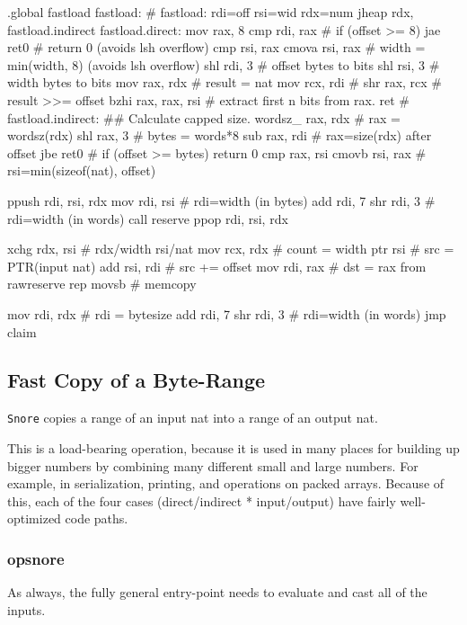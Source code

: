 \begin{asm}
.global fastload
fastload:                       # fastload: rdi=off rsi=wid rdx=num
	jheap	rdx, fastload.indirect
fastload.direct:
	mov	rax, 8
	cmp	rdi, rax        # if (offset >= 8)
	jae	ret0            #   return 0 (avoids lsh overflow)
	cmp	rsi, rax
	cmova	rsi, rax        # width = min(width, 8)  (avoids lsh overflow)
	shl	rdi, 3		# offset bytes to bits
	shl	rsi, 3		# width bytes to bits
	mov	rax, rdx        # result = nat
	mov	rcx, rdi        #
	shr	rax, rcx        #   result >>= offset
	bzhi	rax, rax, rsi	#   extract first n bits from rax.
	ret                     #
fastload.indirect:
	## Calculate capped size.
	wordsz_	rax, rdx	# rax = wordsz(rdx)
	shl	rax, 3		# bytes = words*8
	sub	rax, rdi	# rax=size(rdx) after offset
	jbe	ret0            # if (offset >= bytes) return 0
	cmp	rax, rsi
	cmovb	rsi, rax	# rsi=min(sizeof(nat), offset)

	ppush	rdi, rsi, rdx
	mov	rdi, rsi	# rdi=width (in bytes)
	add	rdi, 7
	shr	rdi, 3		# rdi=width (in words)
	call	reserve
	ppop	rdi, rsi, rdx

	xchg	rdx, rsi        # rdx/width rsi/nat
	mov	rcx, rdx	# count = width
	ptr	rsi             # src = PTR(input nat)
	add	rsi, rdi	# src += offset
	mov	rdi, rax	# dst = rax from rawreserve
	rep	movsb           # memcopy

	mov	rdi, rdx        # rdi = bytesize
	add	rdi, 7
	shr	rdi, 3		# rdi=width (in words)
	jmp	claim
\end{asm}

\subsection{Fast Copy of a Byte-Range}

\lstinline|Snore| copies a range of an input nat into a range of an
output nat.

This is a load-bearing operation, because it is used in many places
for building up bigger numbers by combining many different small and
large numbers.  For example, in serialization, printing, and operations on
packed arrays.  Because of this, each of the four cases (direct/indirect *
input/output) have fairly well-optimized code paths.

\subsubsection{opsnore}

As always, the fully general entry-point needs to evaluate and cast all
of the inputs.

